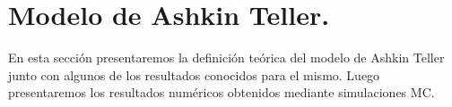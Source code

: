 \section{Modelo de Ashkin Teller.}
\label{sec:AT_intro}
En esta sección presentaremos la definición teórica del modelo de Ashkin Teller junto con algunos de los resultados conocidos para el mismo.
Luego presentaremos los resultados numéricos obtenidos mediante simulaciones MC.\\
